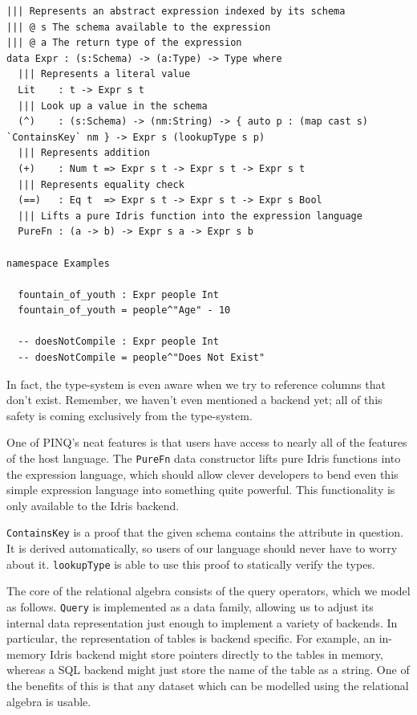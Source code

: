 \documentclass[12pt]{report}
\begin{document}
\begin{lstlisting}[caption={Representing expressions},label={lst:expressions}]
||| Represents an abstract expression indexed by its schema
||| @ s The schema available to the expression
||| @ a The return type of the expression
data Expr : (s:Schema) -> (a:Type) -> Type where
  ||| Represents a literal value
  Lit    : t -> Expr s t
  ||| Look up a value in the schema
  (^)    : (s:Schema) -> (nm:String) -> { auto p : (map cast s) `ContainsKey` nm } -> Expr s (lookupType s p)
  ||| Represents addition
  (+)    : Num t => Expr s t -> Expr s t -> Expr s t
  ||| Represents equality check
  (==)   : Eq t  => Expr s t -> Expr s t -> Expr s Bool
  ||| Lifts a pure Idris function into the expression language
  PureFn : (a -> b) -> Expr s a -> Expr s b

namespace Examples

  fountain_of_youth : Expr people Int
  fountain_of_youth = people^"Age" - 10

  -- doesNotCompile : Expr people Int
  -- doesNotCompile = people^"Does Not Exist"
\end{lstlisting}

In fact, the type-system is even aware when we try to reference columns that don't exist.
Remember, we haven't even mentioned a backend yet; all of this safety is coming exclusively from the type-system.

One of PINQ's neat features is that users have access to nearly all of the features of the host language.
The \texttt{PureFn} data constructor lifts pure Idris functions into the expression language, which should allow clever developers to bend even this simple expression language into something quite powerful.
This functionality is only available to the Idris backend.

\texttt{ContainsKey} is a proof that the given schema contains the attribute in question.
It is derived automatically, so users of our language should never have to worry about it.
\texttt{lookupType} is able to use this proof to statically verify the types.

The core of the relational algebra consists of the query operators, which we model as follows.
\texttt{Query} is implemented as a data family, allowing us to adjust its internal data representation just enough to implement a variety of backends.
In particular, the representation of tables is backend specific.
For example, an in-memory Idris backend might store pointers directly to the tables in memory, whereas a SQL backend might just store the name of the table as a string.
One of the benefits of this is that any dataset which can be modelled using the relational algebra is usable.
\end{document}
